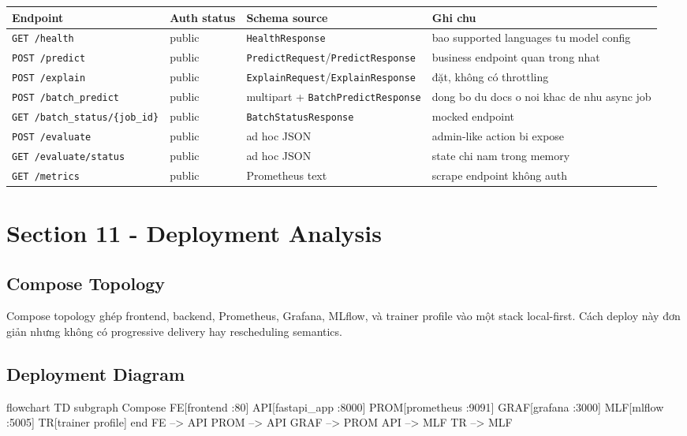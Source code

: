 \begin{table}[H]
\centering
\begin{tabularx}{\textwidth}{@{}l l l X@{}}
\toprule
\textbf{Endpoint} & \textbf{Auth status} & \textbf{Schema source} & \textbf{Ghi chu} \\
\midrule
\texttt{GET /health} & public & \texttt{HealthResponse} & bao supported languages tu model config \\
\texttt{POST /predict} & public & \texttt{PredictRequest}/\texttt{PredictResponse} & business endpoint quan trong nhat \\
\texttt{POST /explain} & public & \texttt{ExplainRequest}/\texttt{ExplainResponse} & đặt, không có throttling \\
\texttt{POST /batch\_predict} & public & multipart + \texttt{BatchPredictResponse} & dong bo du docs o noi khac de nhu async job \\
\texttt{GET /batch\_status/\{job\_id\}} & public & \texttt{BatchStatusResponse} & mocked endpoint \\
\texttt{POST /evaluate} & public & ad hoc JSON & admin-like action bi expose \\
\texttt{GET /evaluate/status} & public & ad hoc JSON & state chi nam trong memory \\
\texttt{GET /metrics} & public & Prometheus text & scrape endpoint không auth \\
\bottomrule
\end{tabularx}
\end{table}

\section{Section 11 - Deployment Analysis}
\subsection{Compose Topology}
Compose topology ghép frontend, backend, Prometheus, Grafana, MLflow, và trainer profile vào một stack local-first. Cách deploy này đơn giản nhưng không có progressive delivery hay rescheduling semantics.

\subsection{Deployment Diagram}
\begin{mermaidblock}
flowchart TD
  subgraph Compose
    FE[frontend :80]
    API[fastapi_app :8000]
    PROM[prometheus :9091]
    GRAF[grafana :3000]
    MLF[mlflow :5005]
    TR[trainer profile]
  end
  FE --> API
  PROM --> API
  GRAF --> PROM
  API --> MLF
  TR --> MLF
\end{mermaidblock}

